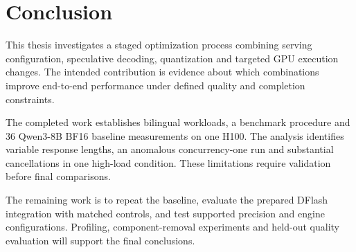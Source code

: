 \chapter{Conclusion}
\label{chap:conclusion}

This thesis investigates a staged optimization process combining serving configuration, speculative decoding, quantization and targeted GPU execution changes. The intended contribution is evidence about which combinations improve end-to-end performance under defined quality and completion constraints.

The completed work establishes bilingual workloads, a benchmark procedure and 36 Qwen3-8B BF16 baseline measurements on one H100. The analysis identifies variable response lengths, an anomalous concurrency-one run and substantial cancellations in one high-load condition. These limitations require validation before final comparisons.

The remaining work is to repeat the baseline, evaluate the prepared DFlash integration with matched controls, and test supported precision and engine configurations. Profiling, component-removal experiments and held-out quality evaluation will support the final conclusions.

